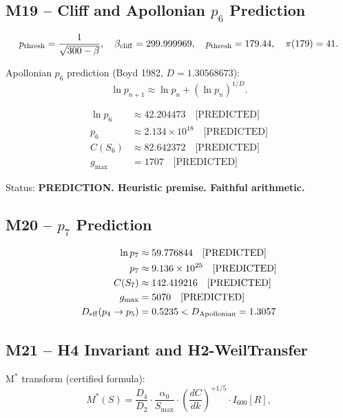 \documentclass[12pt,letterpaper]{article}
\begin{document}
\subsection{M19 -- Cliff and Apollonian $p_6$ Prediction}

\begin{equation}
  p_{\rm thresh} = \frac{1}{\sqrt{300 - \beta}},
  \quad \beta_{\rm cliff} = 299.999969,
  \quad p_{\rm thresh} = 179.44,
  \quad \pi(179) = 41.
  \label{eq:pthresh}
\end{equation}

Apollonian $p_6$ prediction (Boyd 1982, $D = 1.30568673$):
\begin{equation}
  \ln p_{n+1} \approx \ln p_n + (\ln p_n)^{1/D}.
  \label{eq:Apollonian}
\end{equation}

\begin{align}
  \ln p_6 &\approx 42.204473 \quad\text{[PREDICTED]} \\
  p_6 &\approx 2.134 \times 10^{18} \quad\text{[PREDICTED]} \\
  C(S_6) &\approx 82.642372 \quad\text{[PREDICTED]} \\
  g_{\max} &= 1707 \quad\text{[PREDICTED]}
\end{align}

Status: \textbf{PREDICTION. Heuristic premise. Faithful arithmetic.}

\subsection{M20 -- $p_7$ Prediction}

\begin{align}
  \ln p_7 &\approx 59.776844 \quad\text{[PREDICTED]} \\
  p_7 &\approx 9.136 \times 10^{25} \quad\text{[PREDICTED]} \\
  C(S_7) &\approx 142.419216 \quad\text{[PREDICTED]} \\
  g_{\max} &= 5070 \quad\text{[PREDICTED]} \\
  D_{\rm eff}(p_4 \to p_5) &= 0.5235 < D_{\rm Apollonian} = 1.3057
\end{align}

\subsection{M21 -- H4 Invariant and H2-WeilTransfer}

M$^*$ transform (certified formula):
\begin{equation}
  M^*(S) = \frac{D_4}{D_2}
  \cdot \frac{\alpha_0}{S_{\max}}
  \cdot \left(\frac{dC}{dk}\right)^{+1/5}
  \cdot I_{600}[R],
  \label{eq:Mstar_full}
\end{equation}
\end{document}
